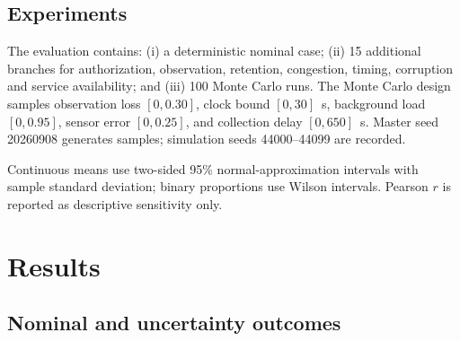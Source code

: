 ﻿\documentclass[10pt,a4paper,twocolumn]{article}
\begin{document}
\subsection{Experiments}

The evaluation contains: (i) a deterministic nominal case; (ii) 15 additional branches for authorization, observation, retention, congestion, timing, corruption and service availability; and (iii) 100 Monte Carlo runs. The Monte Carlo design samples observation loss \([0,0.30]\), clock bound \([0,30]\)~s, background load \([0,0.95]\), sensor error \([0,0.25]\), and collection delay \([0,650]\)~s. Master seed 20260908 generates samples; simulation seeds 44000--44099 are recorded.

Continuous means use two-sided 95\% normal-approximation intervals with sample standard deviation; binary proportions use Wilson intervals. Pearson \(r\) is reported as descriptive sensitivity only.

\section{Results}

\subsection{Nominal and uncertainty outcomes}

\begin{table}[t]
\centering
\caption{UC4 nominal and Monte Carlo outcomes.}
\label{tab:results}
\end{table}
\end{document}
